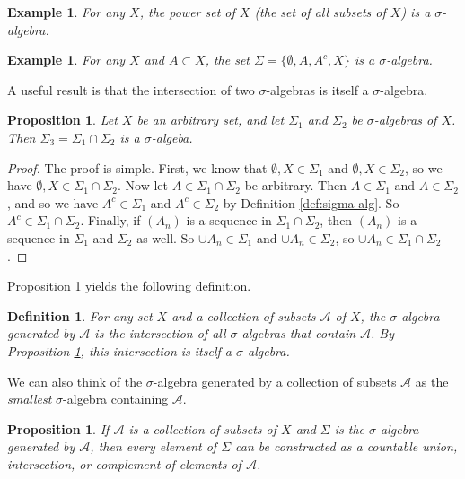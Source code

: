 \documentclass{amsart}
\newtheorem{proposition}[theorem]{Proposition}
\newtheorem{definition}[theorem]{Definition}
\newtheorem{example}[theorem]{Example}
\begin{document}
\begin{example}
    For any $X$, the power set of $X$ (the set of all subsets of $X$) is a
    $\sigma$-algebra.
\end{example}

\begin{example}
    For any $X$ and $A \subset X$, the set $\Sigma = \{\emptyset, A, A^c, X \}$
    is a $\sigma$-algebra.
\end{example}


A useful result is that the intersection of two $\sigma$-algebras is itself a
$\sigma$-algebra.

\begin{proposition}\label{prop:intersection-sig-alg}
    Let $X$ be an arbitrary set, and let $\Sigma_1$ and $\Sigma_2$ be
    $\sigma$-algebras of $X$. Then $\Sigma_3 = \Sigma_1 \cap \Sigma_2$ is a $\sigma$-algeba.
\end{proposition}

\begin{proof}
    The proof is simple. First, we know that $\emptyset, X \in \Sigma_1$ and
    $\emptyset, X \in \Sigma_2$, so we have $\emptyset, X \in \Sigma_1 \cap
    \Sigma_2$. Now let $A \in \Sigma_1 \cap \Sigma_2$ be arbitrary. Then $A \in
    \Sigma_1$ and $A \in \Sigma_2$, and so we have $A^c \in \Sigma_1$ and $A^c
    \in \Sigma_2$ by Definition \ref{def:sigma-alg}. So $A^c \in \Sigma_1 \cap
    \Sigma_2$. Finally, if $(A_n)$ is a sequence in $\Sigma_1 \cap \Sigma_2$,
    then $(A_n)$ is a sequence in $\Sigma_1$ and $\Sigma_2$ as well. So $\cup A_n
    \in \Sigma_1$ and $\cup A_n \in \Sigma_2$, so $\cup A_n \in \Sigma_1 \cap \Sigma_2$.
\end{proof}

Proposition \ref{prop:intersection-sig-alg} yields the following definition.

\begin{definition}
   For any set $X$ and a collection of subsets $\mathcal{A}$ of $X$, the
   $\sigma$-algebra generated by $\mathcal{A}$ is the intersection of all
   $\sigma$-algebras that contain $\mathcal{A}$. By Proposition
   \ref{prop:intersection-sig-alg}, this intersection is itself a $\sigma$-algebra.
\end{definition}

We can also think of the $\sigma$-algebra generated by a collection of subsets
$\mathcal{A}$ as the \textit{smallest} $\sigma$-algebra containing
$\mathcal{A}$.

\begin{proposition}\label{prop:generated-sig-alg-operations}
    If $\mathcal{A}$ is a collection of subsets of $X$ and $\Sigma$ is the
    $\sigma$-algebra generated by $\mathcal{A}$, then every element of $\Sigma$
    can be constructed as a countable union, intersection, or complement of
    elements of $\mathcal{A}$.
\end{proposition}
\end{document}
